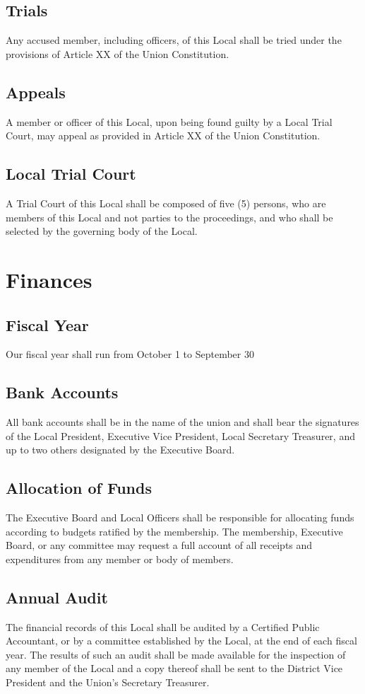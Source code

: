 \documentclass[12pt]{article}
\begin{document}
\subsection{Trials}
Any accused member, including officers, of this Local shall be tried under the provisions of Article XX of the Union  Constitution.

\subsection{Appeals}
A member or officer of this Local, upon being found guilty by a Local Trial Court, may appeal as provided in  Article XX of the Union Constitution.

\subsection{Local Trial Court}
A Trial Court of this Local shall be composed of five (5) persons, who are members of this Local and not parties to the proceedings, and who shall be selected by the governing body of the Local.

\section{Finances}
\subsection{Fiscal Year}
Our fiscal year shall run from October 1 to September 30

\subsection{Bank Accounts}
All bank accounts shall be in the name of the union and shall bear the signatures of the Local President, Executive Vice President, Local Secretary Treasurer, and up to two others designated by the Executive Board.

\subsection{Allocation of Funds}
The Executive Board and Local Officers shall be responsible for allocating funds according to budgets ratified by the membership. The membership, Executive Board, or any committee may request a full account of all receipts and expenditures from any member or body of members.

\subsection{Annual Audit}
The financial records of this Local shall be audited by a Certified Public Accountant, or by a committee established by the Local, at the end of each fiscal year. The results of such an audit shall be made available for the inspection of any member of the Local and a copy thereof shall be sent to the District Vice President and the Union’s Secretary Treasurer.
\end{document}
